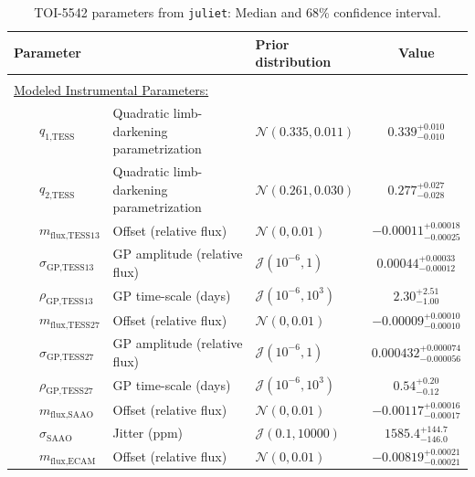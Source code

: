 \documentclass{aa}
\newcommand{\juliet}{{\sc \tt juliet}\xspace}
\begin{document}
%
\begin{table}
\centering
\begin{minipage}{16cm}
\caption{TOI-5542 parameters from \juliet: Median and 68\% confidence interval.}
\begin{tabular}{lllc}\hline 

\hline\hline

\noalign{\smallskip}
Parameter       & &    Prior distribution\raggedright* & Value     \\
\hline
\smallskip\\\multicolumn{2}{l}{\underline{Modeled Instrumental Parameters:}}&\smallskip\\


~~~~$q_{\text{1,TESS}}$\dotfill & Quadratic limb-darkening parametrization\dotfill & $\mathcal{N}(0.335,0.011)$\dotfill & $0.339^{+0.010}_{-0.010}$ \\
~~~~$q_{\text{2,TESS}}$\dotfill & Quadratic limb-darkening parametrization\dotfill & $\mathcal{N}(0.261,0.030)$\dotfill & $0.277^{+0.027}_{-0.028}$ \\
~~~~$m_{\text{flux,TESS13}}$\dotfill & Offset (relative flux)\dotfill & $\mathcal{N}(0,0.01)$\dotfill & $-0.00011^{+0.00018}_{-0.00025}$ \\
~~~~$\sigma_{\text{GP,TESS13}}$\dotfill & GP amplitude (relative flux)\dotfill & $\mathcal{J}(10^{-6},1)$\dotfill &  $0.00044^{+0.00033}_{-0.00012}$ \\
~~~~$\rho_{\text{GP,TESS13}}$\dotfill & GP time-scale (days)\dotfill & $\mathcal{J}(10^{-6},10^{3})$\dotfill &  $2.30^{+2.51}_{-1.00}$ \\
~~~~$m_{\text{flux,TESS27}}$\dotfill & Offset (relative flux)\dotfill & $\mathcal{N}(0,0.01)$\dotfill &  $-0.00009^{+0.00010}_{-0.00010}$ \\
~~~~$\sigma_{\text{GP,TESS27}}$\dotfill & GP amplitude (relative flux)\dotfill & $\mathcal{J}(10^{-6},1)$\dotfill &  $0.000432^{+0.000074}_{-0.000056}$ \\
~~~~$\rho_{\text{GP,TESS27}}$\dotfill & GP time-scale (days)\dotfill & $\mathcal{J}(10^{-6},10^{3})$\dotfill &  $0.54^{+0.20}_{-0.12}$ \\
~~~~$m_{\text{flux,SAAO}}$\dotfill & Offset (relative flux)\dotfill & $\mathcal{N}(0,0.01)$\dotfill &  $-0.00117^{+0.00016}_{-0.00017}$ \\
~~~~$\sigma_{\text{SAAO}}$\dotfill  & Jitter (ppm)\dotfill & $\mathcal{J}(0.1,10000)$\dotfill & $1585.4^{+144.7}_{-146.0}$ \\
~~~~$m_{\text{flux,ECAM}}$\dotfill & Offset (relative flux)\dotfill & $\mathcal{N}(0,0.01)$\dotfill &  $-0.00819^{+0.00021}_{-0.00021}$ \\

\end{tabular}
\end{minipage}
\end{table}
\end{document}
